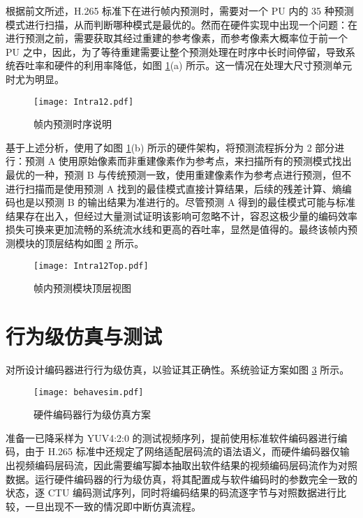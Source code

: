 根据前文所述，H.265 标准下在进行帧内预测时，需要对一个 PU 内的 35 种预测模式进行扫描，从而判断哪种模式是最优的。然而在硬件实现中出现一个问题：在进行预测之前，需要获取其经过重建的参考像素，而参考像素大概率位于前一个 PU 之中，因此，为了等待重建需要让整个预测处理在时序中长时间停留，导致系统吞吐率和硬件的利用率降低，如图 \ref{fig:Intra12}(a) 所示。这一情况在处理大尺寸预测单元时尤为明显。
\begin{figure}[hbt]
    \centering
    \texttt{[image: Intra12.pdf]}
    \caption{帧内预测时序说明}
    \label{fig:Intra12}
\end{figure}
基于上述分析，使用了如图 \ref{fig:Intra12}(b) 所示的硬件架构，将预测流程拆分为 2 部分进行：预测 A 使用原始像素而非重建像素作为参考点，来扫描所有的预测模式找出最优的一种，预测 B 与传统预测一致，使用重建像素作为参考点进行预测，但不进行扫描而是使用预测 A 找到的最佳模式直接计算结果，后续的残差计算、熵编码也是以预测 B 的输出结果为准进行的。尽管预测 A 得到的最佳模式可能与标准结果存在出入，但经过大量测试证明该影响可忽略不计，容忍这极少量的编码效率损失可换来更加流畅的系统流水线和更高的吞吐率，显然是值得的。最终该帧内预测模块的顶层结构如图 \ref{fig:Intra12Top} 所示。
\begin{figure}[hbt]
    \centering
    \texttt{[image: Intra12Top.pdf]}
    \caption{帧内预测模块顶层视图}
    \label{fig:Intra12Top}
\end{figure}

\section{行为级仿真与测试}
对所设计编码器进行行为级仿真，以验证其正确性。系统验证方案如图 \ref{fig:behavesim} 所示。
\begin{figure}[hbt]
    \centering
    \texttt{[image: behavesim.pdf]}
    \caption{硬件编码器行为级仿真方案}
    \label{fig:behavesim}
\end{figure}
准备一已降采样为 YUV4:2:0 的测试视频序列，提前使用标准软件编码器进行编码，由于 H.265 标准中还规定了网络适配层码流的语法语义，而硬件编码器仅输出视频编码层码流，因此需要编写脚本抽取出软件结果的视频编码层码流作为对照数据。运行硬件编码器的行为级仿真，将其配置成与软件编码时的参数完全一致的状态，逐 CTU 编码测试序列，同时将编码结果的码流逐字节与对照数据进行比较，一旦出现不一致的情况即中断仿真流程。


